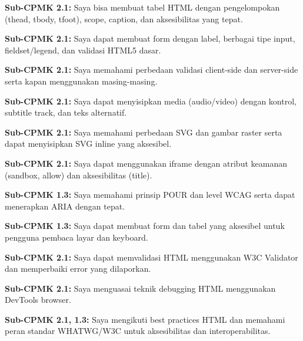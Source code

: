 \documentclass[../main.tex]{subfiles}
\begin{document}
\begin{checklist}
  \item \textbf{Sub-CPMK 2.1:} Saya bisa membuat tabel HTML dengan pengelompokan (thead, tbody, tfoot), scope, caption, dan aksesibilitas yang tepat.
  \item \textbf{Sub-CPMK 2.1:} Saya dapat membuat form dengan label, berbagai tipe input, fieldset/legend, dan validasi HTML5 dasar.
  \item \textbf{Sub-CPMK 2.1:} Saya memahami perbedaan validasi client-side dan server-side serta kapan menggunakan masing-masing.
  \item \textbf{Sub-CPMK 2.1:} Saya dapat menyisipkan media (audio/video) dengan kontrol, subtitle track, dan teks alternatif.
  \item \textbf{Sub-CPMK 2.1:} Saya memahami perbedaan SVG dan gambar raster serta dapat menyisipkan SVG inline yang aksesibel.
  \item \textbf{Sub-CPMK 2.1:} Saya dapat menggunakan iframe dengan atribut keamanan (sandbox, allow) dan aksesibilitas (title).
  \item \textbf{Sub-CPMK 1.3:} Saya memahami prinsip POUR dan level WCAG serta dapat menerapkan ARIA dengan tepat.
  \item \textbf{Sub-CPMK 1.3:} Saya dapat membuat form dan tabel yang aksesibel untuk pengguna pembaca layar dan keyboard.
  \item \textbf{Sub-CPMK 2.1:} Saya dapat memvalidasi HTML menggunakan W3C Validator dan memperbaiki error yang dilaporkan.
  \item \textbf{Sub-CPMK 2.1:} Saya menguasai teknik debugging HTML menggunakan DevTools browser.
  \item \textbf{Sub-CPMK 2.1, 1.3:} Saya mengikuti best practices HTML dan memahami peran standar WHATWG/W3C untuk aksesibilitas dan interoperabilitas.
\end{checklist}
\end{document}
